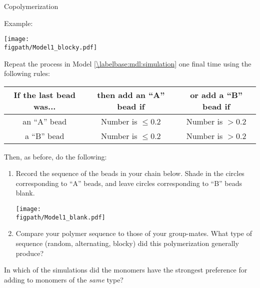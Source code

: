 \begin{activity}{Copolymerization}
\begin{ctqs}
\begin{enumerate}
\begin{solution}[1.5in]
{			Example:
			
				\centerline{\texttt{[image: \\figpath/Model1\_blocky.pdf]}}
				}\end{solution}
		\end{enumerate}
		
	\question \label{\labelbase:ctq:sim-biased} Repeat the process in Model \ref{\labelbase:mdl:simulation} one final time using the following rules:	\begin{center}
					\renewcommand{\arraystretch}{1.5}
					\begin{tabular}{|c|c|c|}
						\hline
						\textbf{If the last bead was...} &  \textbf{then add an ``A'' bead if} & \textbf{or add a ``B'' bead if}\\\hline
						 an ``A'' bead & Number is $\leq 0.2$ & Number is $> 0.2$ \\\hline
						 a ``B'' bead & Number is $\leq 0.2$ & Number is $> 0.2$ \\\hline
					\end{tabular}
					\end{center}
	
		Then, as before, do the following:
		\begin{enumerate}
			\item Record the sequence of the beads in your chain below.  Shade in the circles corresponding to ``A'' beads, and leave circles corresponding to ``B'' beads blank.
	
		\vspace{6pt}
		\centerline{\texttt{[image: \\figpath/Model1\_blank.pdf]}}
	
			\item Compare your polymer sequence to those of your group-mates.  What type of sequence (random, alternating, blocky) did this polymerization generally produce?
			
				\begin{solution}[1.25in]\end{solution}
		\end{enumerate}
		
	\question In which of the simulations did the monomers have the strongest preference for adding to monomers of the \emph{same} type?
	

\end{ctqs}
\end{activity}
